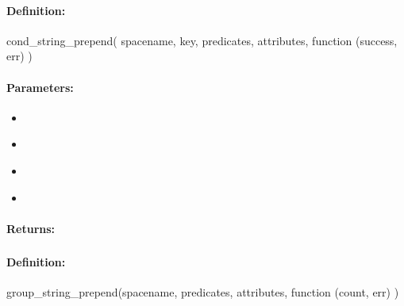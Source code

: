 \paragraph{Definition:}
\begin{javascriptcode}
cond_string_prepend(
        spacename, key, predicates, attributes, function (success, err) {})
\end{javascriptcode}
\paragraph{Parameters:}
\begin{itemize}[noitemsep]
\item {}\\

\item {}\\

\item {}\\

\item {}\\

\end{itemize}

\paragraph{Returns:}


\pagebreak
\subsubsection{}
\label{api:nodejs:group_string_prepend}


\paragraph{Definition:}
\begin{javascriptcode}
group_string_prepend(spacename, predicates, attributes, function (count, err) {})
\end{javascriptcode}
